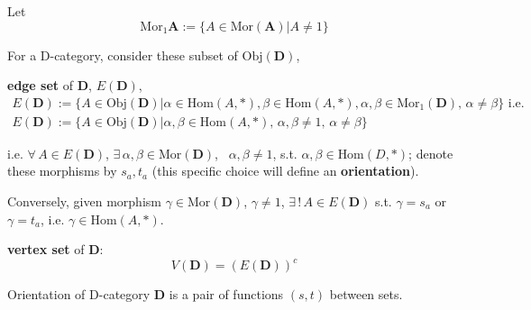 Let 
\begin{equation}
\text{Mor}_{1}{\mathbf{A}} := \lbrace A \in \text{Mor}(\mathbf{A}) | A \neq 1 \rbrace 
\end{equation}

For a D-category, consider these subset of $\text{Obj}(\mathbf{D})$, 

\begin{definition}
	\textbf{edge set} of $\mathbf{D}$, $E(\mathbf{D})$, 
\begin{equation}
\begin{gathered}
E(\mathbf{D}) := \lbrace A \in \text{Obj}(\mathbf{D}) | \alpha \in \text{Hom}(A, *), \beta \in \text{Hom}(A, *), \alpha, \beta \in \text{Mor}_{1}(\mathbf{D}), \, \alpha \neq \beta \rbrace \text{ i.e. } \\
E(\mathbf{D}) := \lbrace A \in \text{Obj}(\mathbf{D}) | \alpha, \beta \in \text{Hom}(A, *), \, \alpha, \beta \neq 1, \, \alpha \neq \beta \rbrace
\end{gathered}
\end{equation}	
\end{definition}
i.e. $\forall \, A \in E(\mathbf{D})$, $\exists \, \alpha, \beta \in \text{Mor}(\mathbf{D})$, \, $\alpha, \beta \neq 1$, s.t. $\alpha, \beta \in \text{Hom}(D, *)$; denote these morphisms by $s_a,t_a$ (this specific choice will define an \textbf{orientation}).

Conversely, given morphism $\gamma \in \text{Mor}(\mathbf{D})$, $\gamma \neq 1$, $\exists \, ! \, A \in E(\mathbf{D})$ s.t. $\gamma = s_a$ or $\gamma = t_a$, i.e. $\gamma \in \text{Hom}(A, *)$. 

\begin{definition}
\textbf{vertex set} of $\mathbf{D}$:
\begin{equation}
 V(\mathbf{D}) = (E(\mathbf{D}))^c
\end{equation} 
\end{definition}

\begin{definition}[Orientation]
	Orientation of D-category $\mathbf{D}$ is a pair of functions $(s,t)$ between sets.
	
\end{definition}


	


